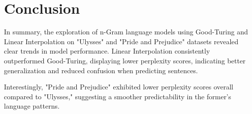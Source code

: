 \section*{Conclusion}

In summary, the exploration of n-Gram language models using Good-Turing and Linear Interpolation on "Ulysses" and "Pride and Prejudice" datasets revealed clear trends in model performance. Linear Interpolation consistently outperformed Good-Turing, displaying lower perplexity scores, indicating better generalization and reduced confusion when predicting sentences.

Interestingly, "Pride and Prejudice" exhibited lower perplexity scores overall compared to "Ulysses," suggesting a smoother predictability in the former's language patterns.
